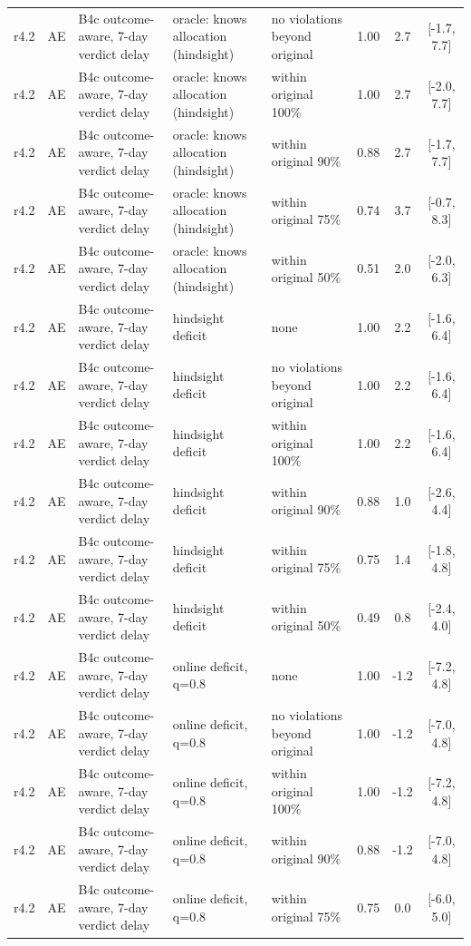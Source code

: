 \begin{longtable}{lllp{4.2cm}p{3.4cm}ccc}
r4.2 & AE & B4c outcome-aware, 7-day verdict delay & oracle: knows allocation (hindsight) & no violations beyond original & 1.00 & 2.7 & [-1.7, 7.7] \\
r4.2 & AE & B4c outcome-aware, 7-day verdict delay & oracle: knows allocation (hindsight) & within original 100\% & 1.00 & 2.7 & [-2.0, 7.7] \\
r4.2 & AE & B4c outcome-aware, 7-day verdict delay & oracle: knows allocation (hindsight) & within original 90\% & 0.88 & 2.7 & [-1.7, 7.7] \\
r4.2 & AE & B4c outcome-aware, 7-day verdict delay & oracle: knows allocation (hindsight) & within original 75\% & 0.74 & 3.7 & [-0.7, 8.3] \\
r4.2 & AE & B4c outcome-aware, 7-day verdict delay & oracle: knows allocation (hindsight) & within original 50\% & 0.51 & 2.0 & [-2.0, 6.3] \\
r4.2 & AE & B4c outcome-aware, 7-day verdict delay & hindsight deficit & none & 1.00 & 2.2 & [-1.6, 6.4] \\
r4.2 & AE & B4c outcome-aware, 7-day verdict delay & hindsight deficit & no violations beyond original & 1.00 & 2.2 & [-1.6, 6.4] \\
r4.2 & AE & B4c outcome-aware, 7-day verdict delay & hindsight deficit & within original 100\% & 1.00 & 2.2 & [-1.6, 6.4] \\
r4.2 & AE & B4c outcome-aware, 7-day verdict delay & hindsight deficit & within original 90\% & 0.88 & 1.0 & [-2.6, 4.4] \\
r4.2 & AE & B4c outcome-aware, 7-day verdict delay & hindsight deficit & within original 75\% & 0.75 & 1.4 & [-1.8, 4.8] \\
r4.2 & AE & B4c outcome-aware, 7-day verdict delay & hindsight deficit & within original 50\% & 0.49 & 0.8 & [-2.4, 4.0] \\
r4.2 & AE & B4c outcome-aware, 7-day verdict delay & online deficit, q=0.8 & none & 1.00 & -1.2 & [-7.2, 4.8] \\
r4.2 & AE & B4c outcome-aware, 7-day verdict delay & online deficit, q=0.8 & no violations beyond original & 1.00 & -1.2 & [-7.0, 4.8] \\
r4.2 & AE & B4c outcome-aware, 7-day verdict delay & online deficit, q=0.8 & within original 100\% & 1.00 & -1.2 & [-7.2, 4.8] \\
r4.2 & AE & B4c outcome-aware, 7-day verdict delay & online deficit, q=0.8 & within original 90\% & 0.88 & -1.2 & [-7.0, 4.8] \\
r4.2 & AE & B4c outcome-aware, 7-day verdict delay & online deficit, q=0.8 & within original 75\% & 0.75 & 0.0 & [-6.0, 5.0] \\

\end{longtable}
